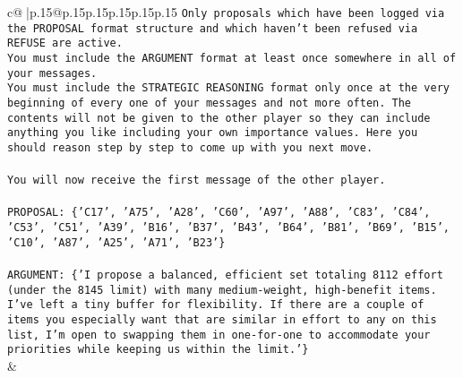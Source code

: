 \documentclass{article}
\begin{document}
{\begin{supertabular}{c@{$\;$}|p{.15\linewidth}@{}p{.15\linewidth}p{.15\linewidth}p{.15\linewidth}p{.15\linewidth}p{.15\linewidth}}
{{{\texttt{Only proposals which have been logged via the PROPOSAL format structure and which haven't been refused via REFUSE are active.} \\
\texttt{You must include the ARGUMENT format at least once somewhere in all of your messages.} \\
\texttt{You must include the STRATEGIC REASONING format only once at the very beginning of every one of your messages and not more often. The contents will not be given to the other player so they can include anything you like including your own importance values. Here you should reason step by step to come up with you next move.} \\
\\ 
\texttt{You will now receive the first message of the other player.} \\
\\ 
\texttt{PROPOSAL: \{'C17', 'A75', 'A28', 'C60', 'A97', 'A88', 'C83', 'C84', 'C53', 'C51', 'A39', 'B16', 'B37', 'B43', 'B64', 'B81', 'B69', 'B15', 'C10', 'A87', 'A25', 'A71', 'B23'\}} \\
\\ 
\texttt{ARGUMENT: \{'I propose a balanced, efficient set totaling 8112 effort (under the 8145 limit) with many medium{-}weight, high{-}benefit items. I’ve left a tiny buffer for flexibility. If there are a couple of items you especially want that are similar in effort to any on this list, I’m open to swapping them in one{-}for{-}one to accommodate your priorities while keeping us within the limit.'\}} \\
            }
        }
    }
    & \\ \\


\end{supertabular}}
\end{document}
